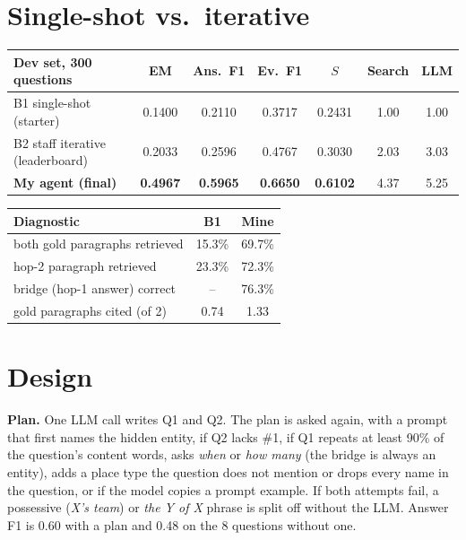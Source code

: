 \documentclass[10pt,a4paper]{article}
\begin{document}
\section{Single-shot vs.\ iterative}
\begin{minipage}[t]{0.585\textwidth}
\vspace{0pt}
\centering\footnotesize
\begin{tabular}{@{}lcccccc@{}}
\toprule
Dev set, 300 questions & EM & Ans.\ F1 & Ev.\ F1 & $S$ & Search & LLM\\
\midrule
B1 single-shot (starter) & 0.1400 & 0.2110 & 0.3717 & 0.2431 & 1.00 & 1.00\\
B2 staff iterative (leaderboard) & 0.2033 & 0.2596 & 0.4767 & 0.3030 & 2.03 & 3.03\\
\textbf{My agent (final)} & \textbf{0.4967} & \textbf{0.5965} & \textbf{0.6650} & \textbf{0.6102} & 4.37 & 5.25\\
\bottomrule
\end{tabular}
\label{tab:main}
\end{minipage}\hfill
\begin{minipage}[t]{0.395\textwidth}
\vspace{0pt}
\centering\footnotesize
\begin{tabular}{@{}lcc@{}}
\toprule
Diagnostic & B1 & Mine\\
\midrule
both gold paragraphs retrieved & 15.3\% & 69.7\%\\
hop-2 paragraph retrieved & 23.3\% & 72.3\%\\
bridge (hop-1 answer) correct & -- & 76.3\%\\
gold paragraphs cited (of 2) & 0.74 & 1.33\\
\bottomrule
\end{tabular}
\end{minipage}

\section{Design}
\textbf{Plan.} One LLM call writes Q1 and Q2. The plan is asked again, with a prompt that first names the hidden
entity, if Q2 lacks \#1, if Q1 repeats at least 90\% of the question's content words, asks \emph{when} or \emph{how
many} (the bridge is always an entity), adds a place type the question does not mention or drops every name in the
question, or if the model copies a prompt example. If both attempts fail, a possessive (\emph{X's team}) or
\emph{the Y of X} phrase is split off without the LLM. Answer F1 is 0.60 with a plan and 0.48 on the 8 questions
without one.
\end{document}
